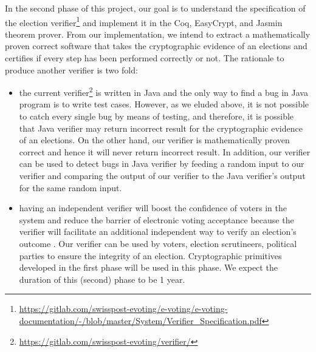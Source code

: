 \documentclass[a4paper]{article}
\begin{document}
In the second phase of this project, our goal is to understand the specification of the election 
verifier\footnote{\url{https://gitlab.com/swisspost-evoting/e-voting/e-voting-documentation/-/blob/master/System/Verifier_Specification.pdf}}
and implement it in the Coq, EasyCrypt, and Jasmin theorem prover. From our implementation, 
we intend to extract a mathematically proven correct software that takes the cryptographic 
evidence of an elections and certifies if every step has been performed correctly or not. The rationale 
to produce another verifier is two fold: 
\begin{itemize}
  \item the current verifier\footnote{\url{https://gitlab.com/swisspost-evoting/verifier/}} 
is written in Java and the only way to 
find a bug in Java program is to write test cases. However, as we eluded above, it is not 
possible to catch every single bug by means of testing, and therefore, it is possible that 
Java verifier may return incorrect result for the cryptographic evidence of an elections. On the 
other hand, our verifier is mathematically proven correct and hence it will never return incorrect result.
In addition, our verifier can be used to detect bugs in Java verifier by feeding a random input 
to our verifier and comparing the output of our verifier to the Java verifier's output for the 
same random input. 

\item having an independent verifier will boost the confidence of voters in the system and 
reduce the barrier of electronic voting acceptance because the verifier will facilitate 
an additional independent way to verify an election's outcome \cite{rivest2008notion}. 
Our verifier can be used by voters, election scrutineers, political parties to ensure the 
integrity of an election. 
Cryptographic primitives developed in the first phase will be used in this phase. 
We expect the duration of this (second) phase to be 1 year.

\end{itemize}
\end{document}
